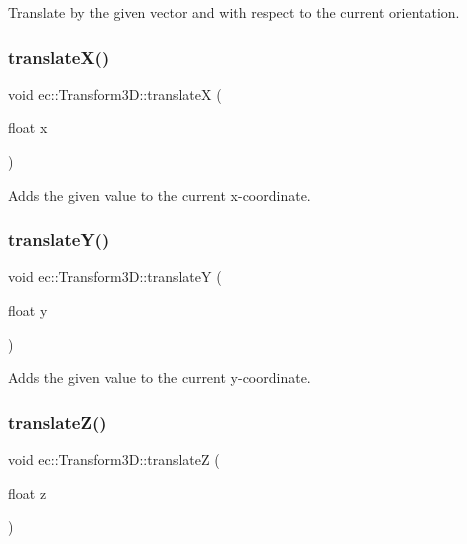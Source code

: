 Translate by the given vector and with respect to the current orientation. \mbox{\label{classec_1_1_transform3_d_a6e8e6da470c6a080b669cd619e8554ef}} 
\subsubsection{\texorpdfstring{translate\+X()}{translateX()}}
{\footnotesize\ttfamily void ec\+::\+Transform3\+D\+::translateX (\begin{DoxyParamCaption}\item[{float}]{x }\end{DoxyParamCaption})}

Adds the given value to the current x-\/coordinate. \mbox{\label{classec_1_1_transform3_d_ab0c9d7ff73b744c480914b7d2aaabf81}} 
\subsubsection{\texorpdfstring{translate\+Y()}{translateY()}}
{\footnotesize\ttfamily void ec\+::\+Transform3\+D\+::translateY (\begin{DoxyParamCaption}\item[{float}]{y }\end{DoxyParamCaption})}

Adds the given value to the current y-\/coordinate. \mbox{\label{classec_1_1_transform3_d_a13ea4d1c69ec17c2ce4c1d8b4068639a}} 
\subsubsection{\texorpdfstring{translate\+Z()}{translateZ()}}
{\footnotesize\ttfamily void ec\+::\+Transform3\+D\+::translateZ (\begin{DoxyParamCaption}\item[{float}]{z }\end{DoxyParamCaption})}

